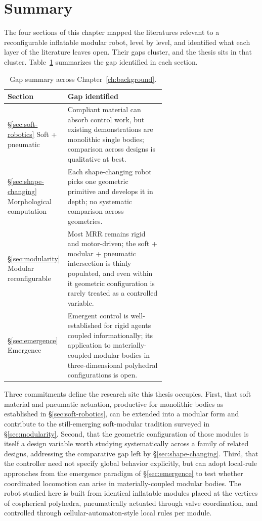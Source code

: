 \section{Summary}
\label{sec:ch2-summary}

The four sections of this chapter mapped the literatures relevant to a reconfigurable inflatable modular robot, level by level, and identified what each layer of the literature leaves open. Their gaps cluster, and the thesis sits in that cluster. Table~\ref{tab:ch2-gaps} summarizes the gap identified in each section.

\begin{table}[h]
\centering
\footnotesize
\caption{Gap summary across Chapter~\ref{ch:background}.}
\label{tab:ch2-gaps}
\begin{tabular}{@{}l p{0.62\linewidth}@{}}
\toprule
\textbf{Section} & \textbf{Gap identified} \\
\midrule
\S\ref{sec:soft-robotics} \quad Soft + pneumatic & Compliant material can absorb control work, but existing demonstrations are monolithic single bodies; comparison across designs is qualitative at best. \\
\addlinespace
\S\ref{sec:shape-changing} \quad Morphological computation & Each shape-changing robot picks one geometric primitive and develops it in depth; no systematic comparison across geometries. \\
\addlinespace
\S\ref{sec:modularity} \quad Modular reconfigurable & Most MRR remains rigid and motor-driven; the soft + modular + pneumatic intersection is thinly populated, and even within it geometric configuration is rarely treated as a controlled variable. \\
\addlinespace
\S\ref{sec:emergence} \quad Emergence & Emergent control is well-established for rigid agents coupled informationally; its application to materially-coupled modular bodies in three-dimensional polyhedral configurations is open. \\
\bottomrule
\end{tabular}
\end{table}

Three commitments define the research site this thesis occupies. First, that soft material and pneumatic actuation, productive for monolithic bodies as established in \S\ref{sec:soft-robotics}, can be extended into a modular form and contribute to the still-emerging soft-modular tradition surveyed in \S\ref{sec:modularity}. Second, that the geometric configuration of those modules is itself a design variable worth studying systematically across a family of related designs, addressing the comparative gap left by \S\ref{sec:shape-changing}. Third, that the controller need not specify global behavior explicitly, but can adopt local-rule approaches from the emergence paradigm of \S\ref{sec:emergence} to test whether coordinated locomotion can arise in materially-coupled modular bodies. The robot studied here is built from identical inflatable modules placed at the vertices of cospherical polyhedra, pneumatically actuated through valve coordination, and controlled through cellular-automaton-style local rules per module.

